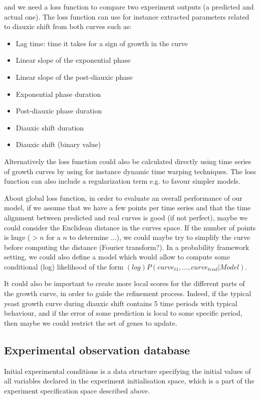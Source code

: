 \documentclass{article}
\begin{document}
and we need a loss function to compare two experiment outputs (a predicted and actual one).
The loss function can use for instance extracted parameters related to diauxic shift from both curves such as: 
\begin{itemize}
 \item Lag time: time it takes for a sign of growth in the curve
 \item Linear slope of the exponential phase
 \item Linear slope of the post-diauxic phase
 \item Exponential phase duration
 \item Post-diauxic phase duration
 \item Diauxic shift duration
 \item Diauxic shift (binary value)
\end{itemize}

Alternatively the loss function could also be calculated directly using time series of growth curves by using for instance 
dynamic time warping techniques. The loss function can also include a regularization term e.g. to favour simpler models.

About global loss function, in order to evaluate an overall performance of our model, if we assume that we have a few points per time series and that the time alignment between predicted and real curves is good (if not perfect), maybe we could consider the Euclidean distance in the curves space. If the number of points is huge ($>n$ for a $n$ to determine ...), we could maybe try to simplify the curve before computing the distance (Fourier transform?). In a probability framework setting, we could also define a model which would allow to compute some conditional (log) likelihood of the form $(log) P(curve_{t1}, ..., curve_{tend}|Model)$.

It could also be important to create more local scores for the different parts of the growth curve, in order to guide the refinement process. Indeed, if the typical yeast growth curve during diauxic shift contains 5 time periods with typical behaviour, and if the error of some prediction is local to some specific period, then maybe we could restrict the set of genes to update.

\subsection{Experimental observation database}

Initial experimental conditions is a data structure specifying the initial values of all variables declared in the experiment initialisation space, which is a part of the experiment specification space described above.
\end{document}
